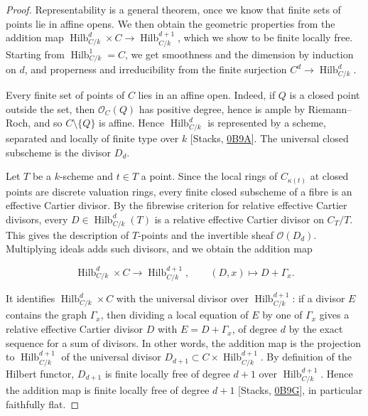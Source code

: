 \documentclass[11pt]{article}
\begin{document}
\begin{proof}[{Proof}]\label{bp22}%
Representability is a general theorem, once we know that finite sets of points lie in affine opens. We then obtain the geometric properties from the addition map \(\operatorname{Hilb}^{d}_{C/k}\times C\to \operatorname{Hilb}^{d+1}_{C/k}\), which we show to be finite locally free. Starting from \(\operatorname{Hilb}^{1}_{C/k}=C\), we get smoothness and the dimension by induction on \(d\), and properness and irreducibility from the finite surjection \(C^d\to \operatorname{Hilb}^{d}_{C/k}\).

Every finite set of points of \(C\) lies in an affine open. Indeed, if \(Q\) is a closed point outside the set, then \(\mathcal O_C(Q)\) has positive degree, hence is ample by Riemann–Roch, and so \(C\setminus\{Q\}\) is affine. Hence \(\operatorname{Hilb}^{d}_{C/k}\) is represented by a scheme, separated and locally of finite type over \(k\) [Stacks, \href{https://stacks.math.columbia.edu/tag/0B9A}{0B9A}]. The universal closed subscheme is the divisor \(D_d\).

Let \(T\) be a \(k\)-scheme and \(t\in T\) a point. Since the local rings of \(C_{\kappa(t)}\) at closed points are discrete valuation rings, every finite closed subscheme of a fibre is an effective Cartier divisor. By the fibrewise criterion for relative effective Cartier divisors, every \(D\in \operatorname{Hilb}^{d}_{C/k}(T)\) is a relative effective Cartier divisor on \(C_T/T\). This gives the description of \(T\)-points and the invertible sheaf \(\mathcal O(D_d)\). Multiplying ideals adds such divisors, and we obtain the addition map

\[
\operatorname{Hilb}^{d}_{C/k}\times C\longrightarrow \operatorname{Hilb}^{d+1}_{C/k},\qquad (D,x)\longmapsto D+\Gamma_x.
\]

It identifies \(\operatorname{Hilb}^{d}_{C/k}\times C\) with the universal divisor over \(\operatorname{Hilb}^{d+1}_{C/k}\): if a divisor \(E\) contains the graph \(\Gamma_x\), then dividing a local equation of \(E\) by one of \(\Gamma_x\) gives a relative effective Cartier divisor \(D\) with \(E=D+\Gamma_x\), of degree \(d\) by the exact sequence for a sum of divisors. In other words, the addition map is the projection to \(\operatorname{Hilb}^{d+1}_{C/k}\) of the universal divisor \(D_{d+1}\subset C\times \operatorname{Hilb}^{d+1}_{C/k}\). By definition of the Hilbert functor, \(D_{d+1}\) is finite locally free of degree \(d+1\) over \(\operatorname{Hilb}^{d+1}_{C/k}\). Hence the addition map is finite locally free of degree \(d+1\) [Stacks, \href{https://stacks.math.columbia.edu/tag/0B9G}{0B9G}], in particular faithfully flat.


\end{proof}
\end{document}
